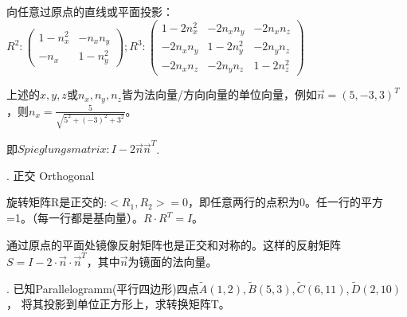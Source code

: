 \documentclass[fleqn]{article}
\begin{document}
向任意过原点的直线或平面投影：$R^2:\begin{pmatrix}
    1-n_x^2&-n_xn_y\\-n_x&1-n_y^2
\end{pmatrix};R^3:\begin{pmatrix}
    1-2n_x^2&-2n_xn_y&-2n_xn_z\\
    -2n_xn_y&1-2n_y^2&-2n_yn_z\\
    -2n_xn_z&-2n_yn_z&1-2n_z^2
\end{pmatrix}$

上述的$x,y,z$或$n_x,n_y,n_z$皆为法向量/方向向量的单位向量，例如$\vec{n}=(5,-3,3)^T$，则$n_x=\frac{5}{\sqrt{5^2+(-3)^2+3^2}}$。

即$Spieglungsmatrix:I-2\vec{n}\vec{n}^T$.

. 正交 Orthogonal

旋转矩阵R是正交的:$<R_1,R_2>=0$，即任意两行的点积为0。任一行的平方=1。（每一行都是基向量）。$R\cdot R^T = I$。

通过原点的平面处镜像反射矩阵也是正交和对称的。这样的反射矩阵$S=I-2\cdot\vec{n}\cdot\vec{n}^T$，其中$\vec{n}$为镜面的法向量。

. 已知Parallelogramm(平行四边形)四点$\widetilde{A}(1,2),\widetilde{B}(5,3),\widetilde{C}(6,11),\widetilde{D}(2,10)$，
将其投影到单位正方形上，求转换矩阵T。
\end{document}
